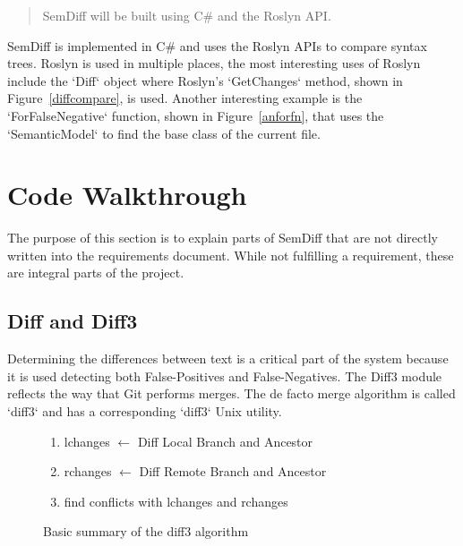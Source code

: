 \documentclass[draftclsnofoot,onecolumn]{IEEEtran}
\begin{document}
\begin{quote}

SemDiff will be built using C\# and the Roslyn API.

\end{quote}

SemDiff is implemented in C\# and uses the Roslyn APIs to compare syntax 
trees. Roslyn is used in multiple places, the most interesting uses of Roslyn 
include the `Diff` object where Roslyn’s `GetChanges` method, shown in 
Figure~\ref{diffcompare}, is used. Another interesting example is the 
`ForFalseNegative` function, shown in Figure~\ref{anforfn}, that uses the 
`SemanticModel` to find the base class of the current file.
\section{Code Walkthrough}%

The purpose of this section is to explain parts of SemDiff that are not 
directly written into the requirements document. While not fulfilling a 
requirement, these are integral parts of the project.

\subsection{Diff and Diff3}%

Determining the differences between text is a critical part of the system 
because it is used detecting both False-Positives and False-Negatives. The 
Diff3 module reflects the way that Git performs merges. The de facto merge 
algorithm is called `diff3` and has a corresponding `diff3` Unix utility. 

\begin{figure}[!t]
\centering
\begin{enumerate}
    \item lchanges $\leftarrow$ Diff Local Branch and Ancestor
    \item rchanges $\leftarrow$ Diff Remote Branch and Ancestor
    \item find conflicts with lchanges and rchanges
\end{enumerate}
\caption{Basic summary of the diff3 algorithm}
\label{diff3algorithm}
\end{figure}
\end{document}
